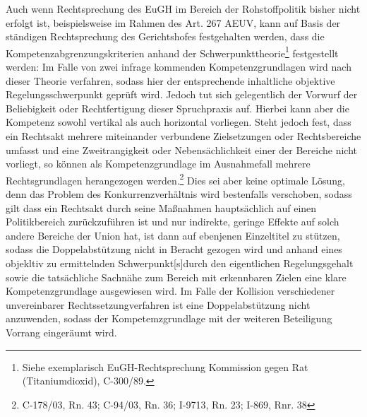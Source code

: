 \documentclass[12pt,a4paper,oneside]{book} %
\begin{document}
	Auch wenn Rechtsprechung des EuGH im Bereich der Rohstoffpolitik bisher nicht erfolgt ist, beispielsweise im Rahmen des Art. 267 AEUV, kann auf Basis der ständigen Rechtsprechung des Gerichtshofes festgehalten werden, dass die Kompetenzabgrenzungskriterien anhand der \glqq Schwerpunkttheorie\grqq\footnote{Siehe exemplarisch EuGH-Rechtsprechung Kommission gegen Rat (Titaniumdioxid), C-300/89.} festgestellt werden: Im Falle von zwei infrage kommenden Kompetenzgrundlagen wird nach dieser Theorie verfahren, sodass hier der entsprechende inhaltliche objektive Regelungsschwerpunkt geprüft wird\autocite[Callies, Art. 175, Rn 22 sowie Kahl, Art. 95, Rn 73ff]{callies_euvaeuv_2022}. Jedoch tut sich gelegentlich der Vorwurf der Beliebigkeit oder Rechtfertigung dieser Spruchpraxis auf.\autocite{Nettesheim, Grabits/Hilf/Nettesheim, AEUV Art 194 Rn. 35} Hierbei kann aber die Kompetenz sowohl vertikal als auch horizontal vorliegen.\autocite[30f.]{callies_stellungnahme_2007} Steht jedoch fest, dass ein Rechtsakt mehrere miteinander verbundene Zielsetzungen oder Rechtsbereiche umfasst und eine Zweitrangigkeit oder Nebensächlichkeit einer der Bereiche nicht vorliegt, so können als Kompetenzgrundlage im Ausnahmefall mehrere Rechtsgrundlagen herangezogen werden.\footnote{C-178/03, Rn. 43; C-94/03, Rn. 36; I-9713, Rn. 23;  I-869, Rnr. 38} Dies sei aber keine optimale Lösung, denn das Problem des Konkurrenzverhältnis wird bestenfalls verschoben, sodass gilt dass ein Rechtsakt durch seine Maßnahmen hauptsächlich auf einen Politikbereich zurückzuführen ist und nur indirekte, geringe Effekte auf solch andere Bereiche der Union hat, ist dann auf ebenjenen Einzeltitel zu stützen, sodass die Doppelabstützung nicht in Beracht gezogen wird und anhand eines \glqq objekltiv zu ermittelnden Schwerpunkt[s]\grqq durch den eigentlichen Regelungsgehalt sowie die tatsächliche Sachnähe zum Bereich mit erkennbaren Zielen eine klare Kompetenzgrundlage ausgewiesen wird.\autocite{Callies, Berliner Beiträge 137, S. 40} Im Falle der Kollision verschiedener unvereinbarer  Rechtssetzungverfahren ist eine Doppelabstützung nicht anzuwenden, sodass der Kompetemzgrundlage mit der weiteren Beteiligung Vorrang eingeräumt wird.\autocite{Callies, Berliner Beiträge 137, S. 40}
\end{document}
